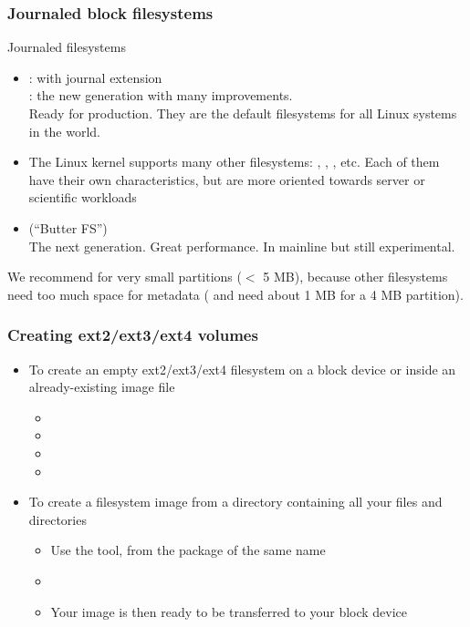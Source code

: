 \begin{frame}
  \frametitle{Journaled block filesystems}
  Journaled filesystems
  \begin{itemize}
  \item {}:  with journal extension\\
    : the new generation with many improvements.\\
    Ready for production. They are the default filesystems for all
    Linux systems in the world.
  \item The Linux kernel supports many other filesystems:
    , , , etc.  Each of them have
    their own characteristics, but are more oriented towards server or
    scientific workloads
  \item {} (``Butter FS'')\\
    The next generation. Great performance. In mainline but still experimental.
  \end{itemize}
  We recommend  for very small partitions ($<$ 5 MB),
  because other filesystems need too much space for metadata
  ( and  need about 1 MB for a 4 MB partition). 
\end{frame}

\begin{frame}
  \frametitle{Creating ext2/ext3/ext4 volumes}
  \begin{itemize}
  \item To create an empty ext2/ext3/ext4 filesystem on a block device or
    inside an already-existing image file
    \begin{itemize}
    \item {}
    \item {}
    \item {}
    \item {}
    \end{itemize}
  \item To create a filesystem image from a directory containing all
    your files and directories
    \begin{itemize}
    \item Use the  tool, from the package of the same name
    \item {}
    \item Your image is then ready to be transferred to your block
      device
    \end{itemize}
  \end{itemize}
\end{frame}

